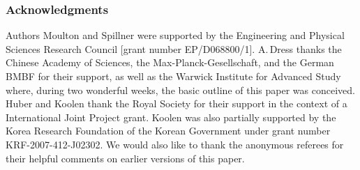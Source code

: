 \documentclass[12pt]{article}
\begin{document}
\subsubsection*{Acknowledgments}
Authors Moulton and Spillner were supported by the 
Engineering and Physical Sciences Research Council 
[grant number EP/D068800/1].  
A.\,Dress thanks the Chinese Academy of Sciences, 
the Max-Planck-Gesellschaft, and the German BMBF for
their support, as well as the Warwick Institute for Advanced Study
where, during two wonderful weeks, the basic outline of this paper was
conceived. Huber and Koolen thank the Royal Society for their
support in the context of a International Joint Project
grant. Koolen was also partially supported by the Korea 
Research Foundation of the Korean Government under grant 
number KRF-2007-412-J02302. 
We would also like to thank the anonymous referees
for their helpful comments on earlier versions of
this paper.
\end{document}
